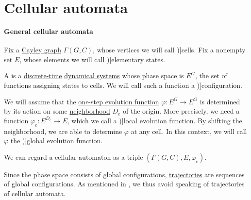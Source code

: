 \section{Cellular automata}\label{sec:cellular_automata}

\paragraph{General cellular automata}

\begin{definition}\label{def:cellular_automaton}
  Fix a \hyperref[def:cayley_graph]{Cayley graph} \( \Gamma(G, C) \), whose vertices we will call \term[en=cell (\cite[def. 2.1.3]{HadelerMüller2017CellularAutomata})]{cells}. Fix a nonempty set \( E \), whose elements we will call \term[en=elementary state (\cite[def. 2.3.1]{HadelerMüller2017CellularAutomata})]{elementary states}.

  A  is a \hyperref[def:discrete_dynamical_system]{discrete-time} \hyperref[def:dynamical_system]{dynamical systems} whose phase space is \( E^G \), the set of functions assigning states to cells. We will call such a function a \term[en=configuration (\cite[def. 2.3.2]{HadelerMüller2017CellularAutomata})]{configuration}.

  We will assume that the \hyperref[def:one_step_evolution_function]{one-step evolution function} \( \varphi: E^G \to E^G \) is determined by its action on some \hyperref[def:cayley_graph_neighborhood]{neighborhood} \( D_e \) of the origin. More precisely, we need a function \( \varphi_e: E^{D_e} \to E \), which we call a \term[en=local function (\cite[def. 2.4.1]{HadelerMüller2017CellularAutomata})]{local evolution function}. By shifting the neighborhood, we are able to determine \( \varphi \) at any cell. In this context, we will call \( \varphi \) the \term[en=global function (\cite[def. 2.4.1]{HadelerMüller2017CellularAutomata})]{global evolution function}.
\end{definition}
\begin{comments}
  \item We can regard a cellular automaton as a triple \( (\Gamma(G, C), E, \varphi_e) \).

  \item Since the phase space consists of global configurations, \hyperref[def:dynamical_system_trajectory]{trajectories} are sequences of global configurations. As mentioned in , we thus avoid speaking of trajectories of cellular automata.
\end{comments}

